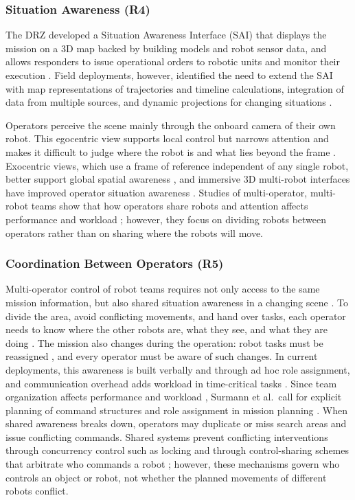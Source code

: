 \documentclass{article}
\begin{document}
\subsubsection{Situation Awareness (R4)}
The DRZ developed a Situation Awareness Interface (SAI) that displays the mission on a 3D map backed by building models and robot sensor data, and allows responders to issue operational orders to robotic units and monitor their execution \cite{kruijff2021}.
Field deployments, however, identified the need to extend the SAI with map representations of trajectories and timeline calculations, integration of data from multiple sources, and dynamic projections for changing situations \cite{surmann2024}.

Operators perceive the scene mainly through the onboard camera of their own robot.
This egocentric view supports local control but narrows attention and makes it difficult to judge where the robot is and what lies beyond the frame \cite{thomas2001, hollands2011}.
Exocentric views, which use a frame of reference independent of any single robot, better support global spatial awareness \cite{pavlovic2009}, and immersive 3D multi-robot interfaces have improved operator situation awareness \cite{roldan2017}.
Studies of multi-operator, multi-robot teams show that how operators share robots and attention affects performance and workload \cite{gao2012teamwork}; however, they focus on dividing robots between operators rather than on sharing where the robots will move.

\subsubsection{Coordination Between Operators (R5)}
Multi-operator control of robot teams requires not only access to the same mission information, but also shared situation awareness in a changing scene \cite{endsley2001team}.
To divide the area, avoid conflicting movements, and hand over tasks, each operator needs to know where the other robots are, what they see, and what they are doing \cite{drury2003awareness}.
The mission also changes during the operation: robot tasks must be reassigned \cite{kruijff2021}, and every operator must be aware of such changes.
In current deployments, this awareness is built verbally and through ad hoc role assignment, and communication overhead adds workload in time-critical tasks \cite{surmann2024}.
Since team organization affects performance and workload \cite{gao2012teamwork}, Surmann et al.\ call for explicit planning of command structures and role assignment in mission planning \cite{surmann2024}.
When shared awareness breaks down, operators may duplicate or miss search areas and issue conflicting commands.
Shared systems prevent conflicting interventions through concurrency control such as locking \cite{greenberg1994concurrency} and through control-sharing schemes that arbitrate who commands a robot \cite{music2017control}; however, these mechanisms govern who controls an object or robot, not whether the planned movements of different robots conflict.
\end{document}
